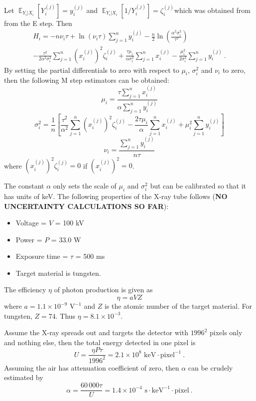 \documentclass[12pt]{report}
\DeclareMathOperator{\expectation}{\mathbb{E}}
\begin{document}
Let $\expectation_{Y_i|X_i}\left[Y_i^{(j)}\right]=y_i^{(j)}$ and $\expectation_{Y_i|X_i}\left[1/Y_i^{(j)}\right]=\zeta_i^{(j)}$which was obtained from from the E step. Then
\begin{multline}
H_i= -n\nu_i\tau+\ln(\nu_i\tau)\sum_{j=1}^ny_i^{(j)}-\frac{n}{2}\ln\left(\frac{\alpha^2\sigma_i^2}{\tau^2}\right)
\\
-\frac{\tau^2}{2\alpha^2\sigma_i^2}\sum_{j=1}^n\left(x_i^{(j)}\right)^2\zeta_i^{(j)}
+ \frac{\tau\mu_i}{\alpha\sigma_i^2}\sum_{j=1}^nx_i^{(j)}
-\frac{\mu_i^2}{2\sigma_i^2}\sum_{j=1}^ny_i^{(j)}
\ .
\end{multline}
By setting the partial differentials to zero with respect to $\mu_i$, $\sigma_i^2$ and $\nu_i$ to zero, then the following M step estimators can be obtained:
\begin{equation}
\mu_i=\frac{\tau\sum_{j=1}^nx_i^{(j)}}{\alpha\sum_{j=1}^ny_i^{(j)}}
\end{equation}
\begin{equation}
\sigma_i^2=\frac{1}{n}\left[
\frac{\tau^2}{\alpha^2}\sum_{j=1}^n\left(x_i^{(j)}\right)^2\zeta_i^{(j)}
-\frac{2\tau\mu_i}{\alpha}\sum_{j=1}^nx_i^{(j)}
+\mu_i^2\sum_{j=1}^ny_i^{(j)}
\right]
\end{equation}
\begin{equation}
\nu_i=\frac{\sum_{j=1}^ny_i^{(j)}}{n\tau}
\end{equation}
where $\left(x_i^{(j)}\right)^2\zeta_i^{(j)}=0$ if $\left(x_i^{(j)}\right)^2=0$.

The constant $\alpha$ only sets the scale of $\mu_i$ and $\sigma_i^2$ but can be calibrated so that it has units of keV. The following properties of the X-ray tube follows (\textbf{NO UNCERTAINTY CALCULATIONS SO FAR}):
\begin{itemize}
	\item Voltage = $V$ = 100 kV
	\item Power = $P$ = 33.0 W
	\item Exposure time = $\tau$ = 500 ms
	\item Target material is tungsten.
\end{itemize}
The efficiency $\eta$ of photon production is given as
\begin{equation}
\eta = aVZ
\end{equation}
where $a=1.1\times10^{-9}\text{ V}^{-1}$ and $Z$ is the atomic number of the target material. For tungsten, $Z=74$. Thus $\eta=8.1\times10^{-3}$.

Assume the X-ray spreads out and targets the detector with $1996^2$ pixels only and nothing else, then the total energy detected in one pixel is
\begin{equation}
U=\frac{\eta P\tau}{1996^2}=2.1\times10^{8}\text{ keV}\cdot\text{pixel}^{-1} \ .
\end{equation}
Assuming the air has attenuation coefficient of zero, then $\alpha$ can be crudely estimated by
\begin{equation}
\alpha = \frac{60\,000 \tau}{U} = 1.4\times10^{-4}\text{ s}\cdot\text{keV}^{-1}\cdot\text{pixel} \ .
\end{equation}
\end{document}
